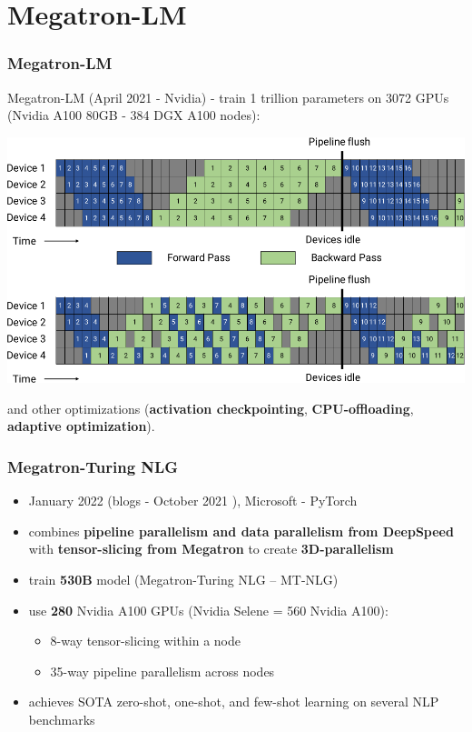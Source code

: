 \documentclass{beamer}
\begin{document}
\section{Megatron-LM}
\begin{frame}
    \frametitle{Megatron-LM \cite{megatronlm_2}}
    Megatron-LM (April 2021 - Nvidia) - train 1 trillion parameters  on 3072 GPUs (Nvidia A100 80GB - 384 DGX A100 nodes):
    \begin{center}
        \includegraphics[scale=1.05]{img/megatron_lm.png}
    \end{center}
    \tiny{and other optimizations (\textbf{activation checkpointing}, \textbf{CPU-offloading}, \textbf{adaptive optimization}).}
\end{frame}

\begin{frame}
    \frametitle{Megatron-Turing NLG \cite{deepspeed_megatron}}
    \begin{itemize}
        \item January 2022 (blogs - October 2021 \cite{blog_mt_nlg}), Microsoft - PyTorch
        \item combines \textbf{pipeline parallelism and data parallelism from DeepSpeed} with \textbf{tensor-slicing from Megatron} to create \textbf{3D-parallelism}
        \item train \textbf{530B} model (Megatron-Turing NLG -- MT-NLG)
        \item use \textbf{280} Nvidia A100 GPUs (Nvidia Selene = 560 Nvidia A100):
        \begin{itemize}
        \item 8-way tensor-slicing within a node
        \item 35-way pipeline parallelism across nodes
        \end{itemize}
        \item achieves SOTA zero-shot, one-shot, and few-shot learning on several NLP benchmarks
    \end{itemize}
\end{frame}
\end{document}
